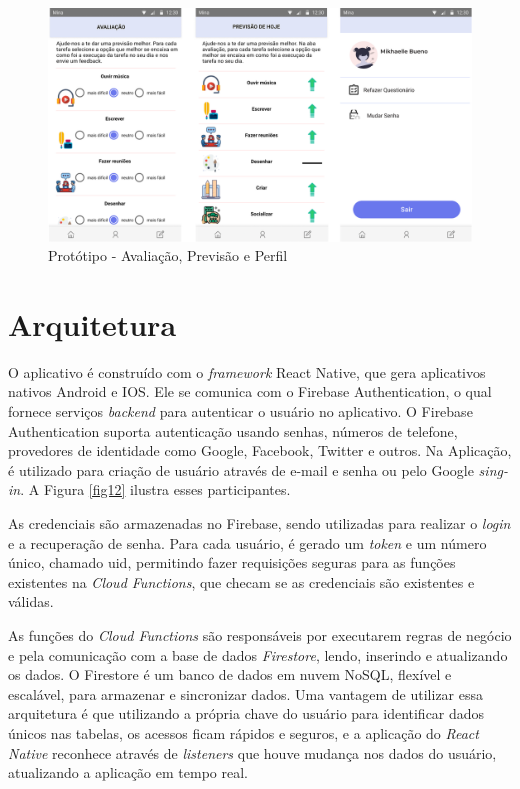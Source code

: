\begin{figure}[ht]
	\caption{Protótipo - Avaliação, Previsão e Perfil}
	\begin{center}
	\includegraphics[keepaspectratio=true,scale=0.3]{figuras/prototipo3-v.png}
	\end{center}
    \label{fig11}
\end{figure}

\section{Arquitetura}
\label{arq}

O aplicativo é construído com o \emph{framework} React Native, que gera aplicativos nativos Android e IOS. 
Ele se comunica com o Firebase Authentication, o qual fornece serviços \emph{backend} para autenticar 
o usuário no aplicativo. O Firebase Authentication suporta 
autenticação usando senhas, números de telefone, provedores de identidade como Google, Facebook, Twitter e 
outros. Na Aplicação, é utilizado para criação de usuário através de e-mail e senha ou 
pelo Google \emph{sing-in}. A Figura \ref{fig12} ilustra esses participantes.

As credenciais são armazenadas no Firebase, sendo utilizadas para realizar o 
\emph{login} e a recuperação de senha. Para cada usuário, é gerado um \emph{token} e um número único, chamado uid, permitindo 
fazer requisições seguras para as funções existentes na \emph{Cloud Functions}, que checam se as credenciais 
são existentes e válidas.

As funções do \emph{Cloud Functions} são responsáveis por executarem regras de negócio e 
pela comunicação com a base de dados \emph{Firestore}, lendo, inserindo e atualizando os dados. 
O Firestore é um banco de dados em nuvem NoSQL, flexível e escalável, para armazenar e sincronizar dados.
Uma vantagem de utilizar essa arquitetura é que utilizando a própria chave do usuário para identificar 
dados únicos nas tabelas, os acessos ficam rápidos e seguros, e a aplicação do \emph{React Native} reconhece 
através de \emph{listeners} que houve mudança nos dados do usuário, atualizando a aplicação em tempo real.
 
